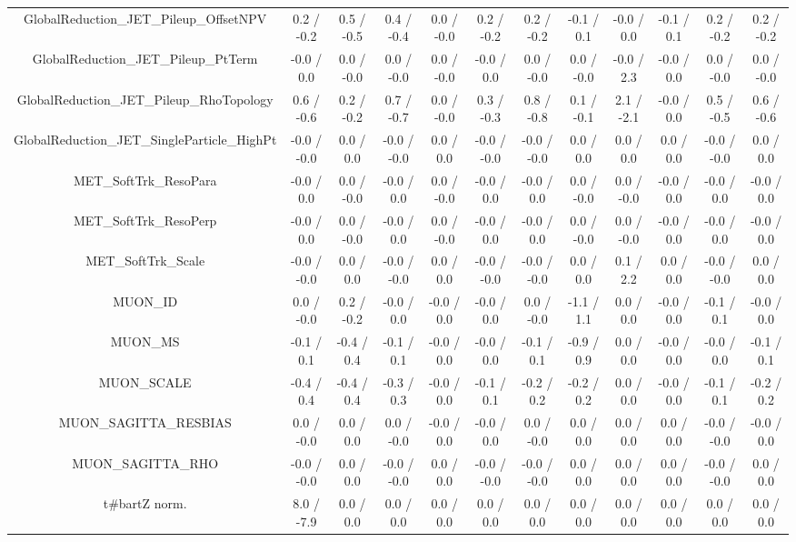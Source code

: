 \begin{table}[htbp]
\begin{center}
\begin{tabular}{|c|c|c|c|c|c|c|c|c|c|c|c|}
  GlobalReduction_JET_Pileup_OffsetNPV & 0.2 / -0.2 & 0.5 / -0.5 & 0.4 / -0.4 & 0.0 / -0.0 & 0.2 / -0.2 & 0.2 / -0.2 & -0.1 / 0.1 & -0.0 / 0.0 & -0.1 / 0.1 & 0.2 / -0.2 & 0.2 / -0.2 \\ 
  GlobalReduction_JET_Pileup_PtTerm & -0.0 / 0.0 & 0.0 / -0.0 & 0.0 / -0.0 & 0.0 / -0.0 & -0.0 / 0.0 & 0.0 / -0.0 & 0.0 / -0.0 & -0.0 / 2.3 & -0.0 / 0.0 & 0.0 / -0.0 & 0.0 / -0.0 \\ 
  GlobalReduction_JET_Pileup_RhoTopology & 0.6 / -0.6 & 0.2 / -0.2 & 0.7 / -0.7 & 0.0 / -0.0 & 0.3 / -0.3 & 0.8 / -0.8 & 0.1 / -0.1 & 2.1 / -2.1 & -0.0 / 0.0 & 0.5 / -0.5 & 0.6 / -0.6 \\ 
  GlobalReduction_JET_SingleParticle_HighPt & -0.0 / -0.0 & 0.0 / 0.0 & -0.0 / -0.0 & 0.0 / 0.0 & -0.0 / -0.0 & -0.0 / -0.0 & 0.0 / 0.0 & 0.0 / 0.0 & 0.0 / 0.0 & -0.0 / -0.0 & 0.0 / 0.0 \\ 
  MET_SoftTrk_ResoPara & -0.0 / 0.0 & 0.0 / -0.0 & -0.0 / 0.0 & 0.0 / -0.0 & -0.0 / 0.0 & -0.0 / 0.0 & 0.0 / -0.0 & 0.0 / -0.0 & -0.0 / 0.0 & -0.0 / 0.0 & -0.0 / 0.0 \\ 
  MET_SoftTrk_ResoPerp & -0.0 / 0.0 & 0.0 / -0.0 & -0.0 / 0.0 & 0.0 / -0.0 & -0.0 / 0.0 & -0.0 / 0.0 & 0.0 / -0.0 & 0.0 / -0.0 & -0.0 / 0.0 & -0.0 / 0.0 & -0.0 / 0.0 \\ 
  MET_SoftTrk_Scale & -0.0 / -0.0 & 0.0 / 0.0 & -0.0 / -0.0 & 0.0 / 0.0 & -0.0 / -0.0 & -0.0 / -0.0 & 0.0 / 0.0 & 0.1 / 2.2 & 0.0 / 0.0 & -0.0 / -0.0 & 0.0 / 0.0 \\ 
  MUON_ID & 0.0 / -0.0 & 0.2 / -0.2 & -0.0 / 0.0 & -0.0 / 0.0 & -0.0 / 0.0 & 0.0 / -0.0 & -1.1 / 1.1 & 0.0 / 0.0 & -0.0 / 0.0 & -0.1 / 0.1 & -0.0 / 0.0 \\ 
  MUON_MS & -0.1 / 0.1 & -0.4 / 0.4 & -0.1 / 0.1 & -0.0 / 0.0 & -0.0 / 0.0 & -0.1 / 0.1 & -0.9 / 0.9 & 0.0 / 0.0 & -0.0 / 0.0 & -0.0 / 0.0 & -0.1 / 0.1 \\ 
  MUON_SCALE & -0.4 / 0.4 & -0.4 / 0.4 & -0.3 / 0.3 & -0.0 / 0.0 & -0.1 / 0.1 & -0.2 / 0.2 & -0.2 / 0.2 & 0.0 / 0.0 & -0.0 / 0.0 & -0.1 / 0.1 & -0.2 / 0.2 \\ 
  MUON_SAGITTA_RESBIAS & 0.0 / -0.0 & 0.0 / 0.0 & 0.0 / -0.0 & -0.0 / 0.0 & -0.0 / 0.0 & 0.0 / -0.0 & 0.0 / 0.0 & 0.0 / 0.0 & 0.0 / 0.0 & -0.0 / -0.0 & -0.0 / 0.0 \\ 
  MUON_SAGITTA_RHO & -0.0 / -0.0 & 0.0 / 0.0 & -0.0 / -0.0 & 0.0 / 0.0 & -0.0 / -0.0 & -0.0 / -0.0 & 0.0 / 0.0 & 0.0 / 0.0 & 0.0 / 0.0 & -0.0 / -0.0 & 0.0 / 0.0 \\ 
  t#bar{t}Z norm. & 8.0 / -7.9 & 0.0 / 0.0 & 0.0 / 0.0 & 0.0 / 0.0 & 0.0 / 0.0 & 0.0 / 0.0 & 0.0 / 0.0 & 0.0 / 0.0 & 0.0 / 0.0 & 0.0 / 0.0 & 0.0 / 0.0 \\ 

\end{tabular}
\end{center}
\end{table}
